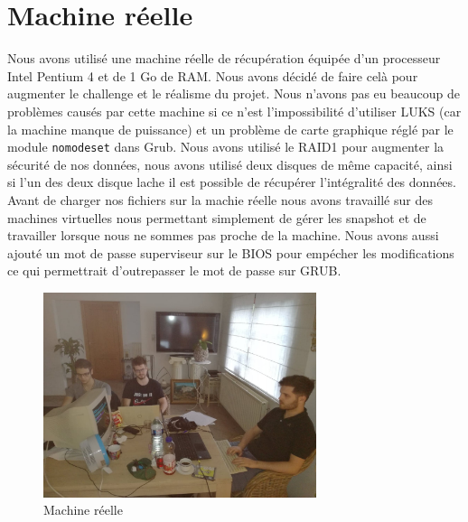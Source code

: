 \section{Machine réelle}
Nous avons utilisé une machine réelle de récupération équipée d'un processeur Intel Pentium 4 et de 1 Go de RAM. Nous avons décidé de faire celà pour augmenter le challenge et le réalisme du projet. Nous n'avons pas eu beaucoup de problèmes causés par cette machine si ce n'est l'impossibilité d'utiliser LUKS (car la machine manque de puissance) et un problème de carte graphique réglé par le module \texttt{nomodeset} dans Grub.
Nous avons utilisé le RAID1 pour augmenter la sécurité de nos données, nous avons utilisé deux disques de même capacité, ainsi si l'un des deux disque lache il est possible de récupérer l'intégralité des données.
Avant de charger nos fichiers sur la machie réelle nous avons travaillé sur des machines virtuelles nous permettant simplement de gérer les snapshot et de travailler lorsque nous ne sommes pas proche de la machine.
Nous avons aussi ajouté un mot de passe superviseur sur le BIOS pour empécher les modifications ce qui permettrait d'outrepasser le mot de passe sur GRUB.

\begin{figure}[H]
	\centering
	\includegraphics[height=6cm]{textures/images/machineReelle.jpg}
	\caption{\label{fig:machinereelle}Machine réelle}
\end{figure}
